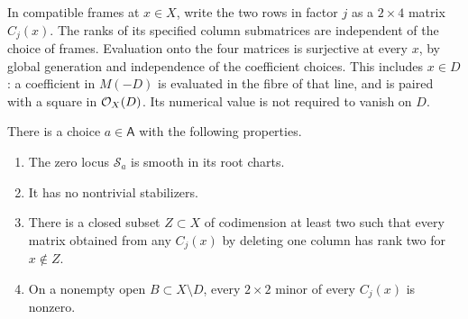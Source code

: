 In compatible frames at $x\in X$, write the two rows in factor $j$ as a $2\times4$ matrix $C_j(x)$. The ranks of its specified column submatrices are independent of the choice of frames. Evaluation onto the four matrices is surjective at every $x$, by global generation and independence of the coefficient choices. This includes $x\in D$: a coefficient in $M(-D)$ is evaluated in the fibre of that line, and is paired with a square in $\mathcal O_X(D)$. Its numerical value is not required to vanish on $D$.

\begin{lemma}\label{lem:parameters}
There is a choice $a\in\mathsf A$ with the following properties.
\begin{enumerate}
\item\label{item:total-smooth} The zero locus $\mathcal S_a$ is smooth in its root charts.
\item\label{item:free} It has no nontrivial stabilizers.
\item\label{item:triples} There is a closed subset $Z\subset X$ of codimension at least two such that every matrix obtained from any $C_j(x)$ by deleting one column has rank two for $x\notin Z$.
\item\label{item:pairs} On a nonempty open $B\subset X\setminus D$, every $2\times2$ minor of every $C_j(x)$ is nonzero.
\end{enumerate}
\end{lemma}

